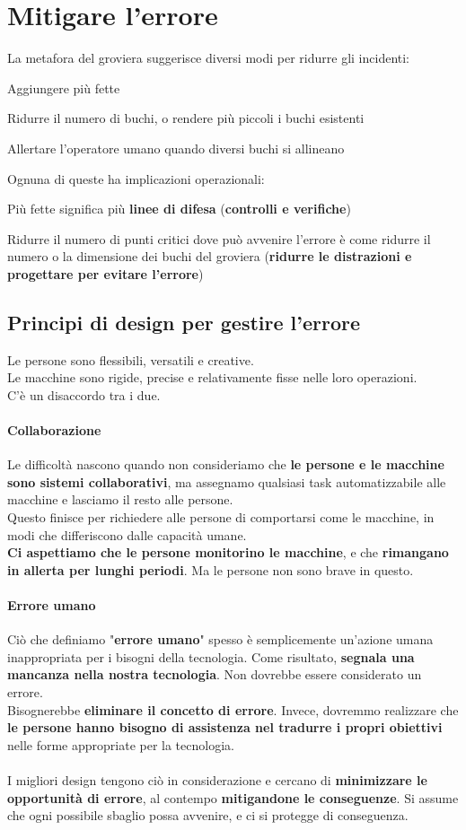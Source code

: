 \documentclass[10pt]{article}
\begin{document}
\section{Mitigare l'errore}
La metafora del groviera suggerisce diversi modi per ridurre gli incidenti:
\begin{list}{}{}
\item Aggiungere più fette
\item Ridurre il numero di buchi, o rendere più piccoli i buchi esistenti
\item Allertare l'operatore umano quando diversi buchi si allineano
\end{list}
Ognuna di queste ha implicazioni operazionali:
\begin{list}{}{}
\item Più fette significa più \textbf{linee di difesa} (\textbf{controlli e verifiche})
\item Ridurre il numero di punti critici dove può avvenire l'errore è come ridurre il numero o la dimensione dei buchi del groviera (\textbf{ridurre le distrazioni e progettare per evitare l'errore})
\end{list}
\subsection{Principi di design per gestire l'errore}
Le persone sono flessibili, versatili e creative.\\
Le macchine sono rigide, precise e relativamente fisse nelle loro operazioni.\\
C'è un disaccordo tra i due.
\paragraph{Collaborazione} Le difficoltà nascono quando non consideriamo che \textbf{le persone e le macchine sono sistemi collaborativi}, ma assegnamo qualsiasi task automatizzabile alle macchine e lasciamo il resto alle persone.\\
Questo finisce per richiedere alle persone di comportarsi come le macchine, in modi che differiscono dalle capacità umane.\\
\textbf{Ci aspettiamo che le persone monitorino le macchine}, e che \textbf{rimangano in allerta per lunghi periodi}. Ma le persone non sono brave in questo.
\paragraph{Errore umano} Ciò che definiamo "\textbf{errore umano}" spesso è semplicemente un'azione umana inappropriata per i bisogni della tecnologia. Come risultato, \textbf{segnala una mancanza nella nostra tecnologia}. Non dovrebbe essere considerato un errore.\\
Bisognerebbe \textbf{eliminare il concetto di errore}. Invece, dovremmo realizzare che \textbf{le persone hanno bisogno di assistenza nel tradurre i propri obiettivi} nelle forme appropriate per la tecnologia.\\\\
I migliori design tengono ciò in considerazione e cercano di \textbf{minimizzare le opportunità di errore}, al contempo \textbf{mitigandone le conseguenze}. Si assume che ogni possibile sbaglio possa avvenire, e ci si protegge di conseguenza.
\end{document}
